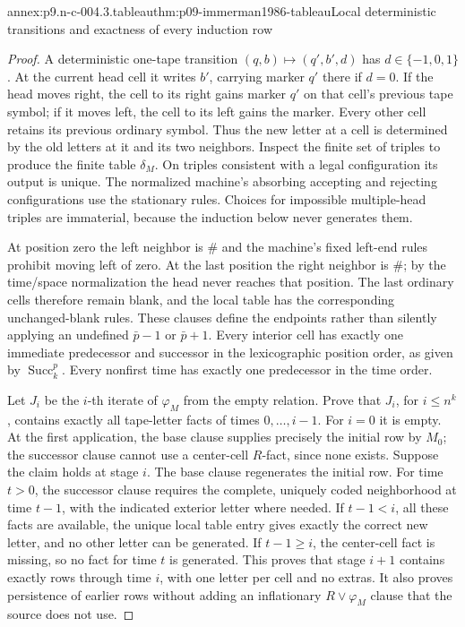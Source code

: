 \begin{annexitem}{annex:p9.n-c-004.3.tableau}{thm:p09-immerman1986-tableau}{Local deterministic transitions and exactness of every induction row}
\begin{proof}
A deterministic one-tape transition \((q,b)\mapsto(q',b',d)\)
has \(d\in\{-1,0,1\}\).  At the current head cell it writes
\(b'\), carrying marker \(q'\) there if \(d=0\).
If the head moves right, the cell to its right gains marker \(q'\)
on that cell's previous tape symbol; if it moves left, the cell to its
left gains the marker.  Every other cell retains its previous ordinary
symbol.  Thus the new letter at a cell is determined by the old letters
at it and its two neighbors.  Inspect the finite set of triples to
produce the finite table \(\delta_M\).  On triples consistent with
a legal configuration its output is unique.  The normalized machine's
absorbing accepting and rejecting configurations use the stationary
rules.  Choices for impossible multiple-head triples are immaterial,
because the induction below never generates them.

At position zero the left neighbor is \(\#\) and the machine's
fixed left-end rules prohibit moving left of zero.  At the last position
the right neighbor is \(\#\); by the time/space normalization the
head never reaches that position.  The last ordinary cells therefore
remain blank, and the local table has the corresponding unchanged-blank
rules.  These clauses define the endpoints rather than silently applying
an undefined \(\bar p-1\) or \(\bar p+1\).  Every interior
cell has exactly one immediate predecessor and successor in the
lexicographic position order, as given by \(\operatorname{Succ}_k^p\).
Every nonfirst time has exactly one predecessor in the time order.

Let \(J_i\) be the \(i\)-th iterate of \(\varphi_M\) from
the empty relation.  Prove that \(J_i\), for \(i\leq n^k\),
contains exactly all tape-letter facts of times \(0,\ldots,i-1\).
For \(i=0\) it is empty.  At the first application, the base clause
supplies precisely the initial row by \(M_0\); the successor
clause cannot use a center-cell \(R\)-fact, since none exists.
Suppose the claim holds at stage \(i\).  The base clause regenerates
the initial row.  For time \(t>0\), the successor clause requires
the complete, uniquely coded neighborhood at time \(t-1\), with
the indicated exterior letter where needed.  If \(t-1<i\), all
these facts are available, the unique local table entry gives exactly
the correct new letter, and no other letter can be generated.
If \(t-1\geq i\), the center-cell fact is missing, so no
fact for time \(t\) is generated.  This proves that stage
\(i+1\) contains exactly rows through time \(i\), with one
letter per cell and no extras.  It also proves persistence of earlier
rows without adding an inflationary \(R\lor\varphi_M\) clause
that the source does not use.


\end{proof}
\end{annexitem}
